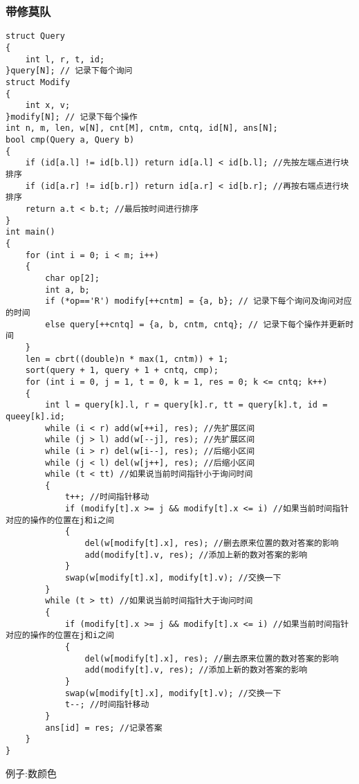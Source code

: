 \documentclass[a4paper,fontset=none]{ctexart}
\begin{document}
\subsubsection{带修莫队}
\begin{verbatim}
struct Query
{
    int l, r, t, id;
}query[N]; // 记录下每个询问
struct Modify
{
    int x, v;
}modify[N]; // 记录下每个操作
int n, m, len, w[N], cnt[M], cntm, cntq, id[N], ans[N];
bool cmp(Query a, Query b)
{
    if (id[a.l] != id[b.l]) return id[a.l] < id[b.l]; //先按左端点进行块排序
    if (id[a.r] != id[b.r]) return id[a.r] < id[b.r]; //再按右端点进行块排序
    return a.t < b.t; //最后按时间进行排序
}
int main()
{
    for (int i = 0; i < m; i++)
    {
        char op[2];
        int a, b;
        if (*op=='R') modify[++cntm] = {a, b}; // 记录下每个询问及询问对应的时间
        else query[++cntq] = {a, b, cntm, cntq}; // 记录下每个操作并更新时间
    }
    len = cbrt((double)n * max(1, cntm)) + 1;
    sort(query + 1, query + 1 + cntq, cmp);
    for (int i = 0, j = 1, t = 0, k = 1, res = 0; k <= cntq; k++)
    {
        int l = query[k].l, r = query[k].r, tt = query[k].t, id = queey[k].id;
        while (i < r) add(w[++i], res); //先扩展区间
        while (j > l) add(w[--j], res); //先扩展区间
        while (i > r) del(w[i--], res); //后缩小区间
        while (j < l) del(w[j++], res); //后缩小区间
        while (t < tt) //如果说当前时间指针小于询问时间
        {
            t++; //时间指针移动
            if (modify[t].x >= j && modify[t].x <= i) //如果当前时间指针对应的操作的位置在j和i之间
            {
                del(w[modify[t].x], res); //删去原来位置的数对答案的影响
                add(modify[t].v, res); //添加上新的数对答案的影响
            }
            swap(w[modify[t].x], modify[t].v); //交换一下
        }
        while (t > tt) //如果说当前时间指针大于询问时间
        {
            if (modify[t].x >= j && modify[t].x <= i) //如果当前时间指针对应的操作的位置在j和i之间
            {
                del(w[modify[t].x], res); //删去原来位置的数对答案的影响
                add(modify[t].v, res); //添加上新的数对答案的影响
            }
            swap(w[modify[t].x], modify[t].v); //交换一下
            t--; //时间指针移动
        }
        ans[id] = res; //记录答案
    }
}
\end{verbatim}
例子:数颜色
\end{document}
